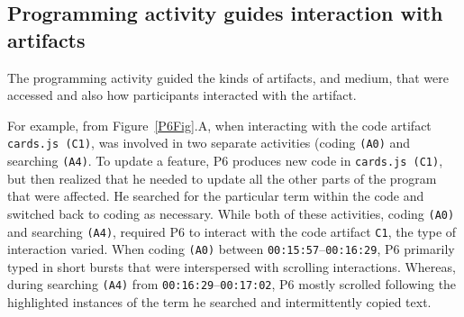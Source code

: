 \subsection{Programming activity guides interaction with artifacts}


The programming activity guided the kinds of artifacts, and medium, that were accessed and also how participants interacted with the artifact.


For example, from Figure~\ref{P6Fig}.A, when interacting with the code artifact \texttt{cards.js (C1)}, was involved in two separate activities (coding \texttt{(A0)} and searching \texttt{(A4)}. To update a feature, P6 produces new code in \texttt{cards.js (C1)}, but then realized that he needed to update all the other parts of the program that were affected. He searched for the particular term within the code and switched back to coding as necessary. While both of these activities, coding \texttt{(A0)} and searching \texttt{(A4)}, required P6 to interact with the code artifact \texttt{C1}, the type of interaction varied. When coding \texttt{(A0)} between \texttt{00:15:57}--\texttt{00:16:29}, P6 primarily typed in short bursts that were interspersed with scrolling interactions. Whereas, during searching \texttt{(A4)} from \texttt{00:16:29}--\texttt{00:17:02}, P6 mostly scrolled following the highlighted instances of the term he searched and intermittently copied text.



